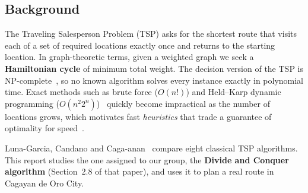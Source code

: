 \subsection{Background}
The Traveling Salesperson Problem (TSP) asks for the shortest route that visits each of a set of required
locations exactly once and returns to the starting location. In graph-theoretic terms, given a weighted
graph we seek a \textbf{Hamiltonian cycle} of minimum total weight. The decision version of the TSP is
NP-complete~\cite{garey1979computers}, so no known algorithm solves every instance exactly in polynomial
time. Exact methods such as brute force ($O(n!)$) and Held--Karp dynamic programming
($O(n^2 2^n)$)~\cite{heldkarp1962} quickly become impractical as the number of locations grows, which
motivates fast \emph{heuristics} that trade a guarantee of optimality for speed~\cite{applegate2006tsp}.

Luna-Garcia, Candano and Caga-anan~\cite{lunagarcia2024performance} compare eight classical TSP algorithms.
This report studies the one assigned to our group, the \textbf{Divide and Conquer algorithm}
(Section~2.8 of that paper), and uses it to plan a real route in Cagayan de Oro City.
